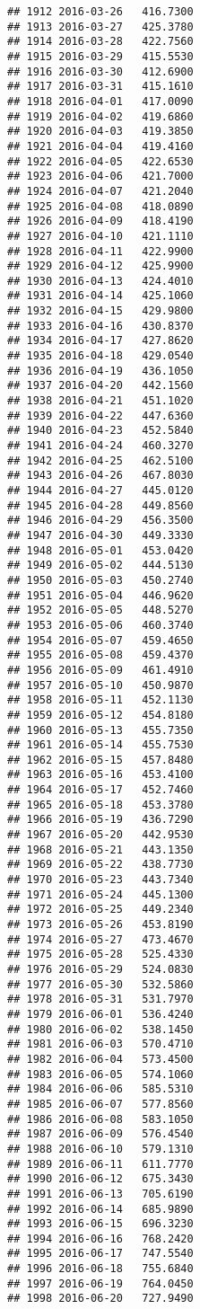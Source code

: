 \documentclass[
]{article}
\begin{document}
\begin{verbatim}
## 1912 2016-03-26   416.7300
## 1913 2016-03-27   425.3780
## 1914 2016-03-28   422.7560
## 1915 2016-03-29   415.5530
## 1916 2016-03-30   412.6900
## 1917 2016-03-31   415.1610
## 1918 2016-04-01   417.0090
## 1919 2016-04-02   419.6860
## 1920 2016-04-03   419.3850
## 1921 2016-04-04   419.4160
## 1922 2016-04-05   422.6530
## 1923 2016-04-06   421.7000
## 1924 2016-04-07   421.2040
## 1925 2016-04-08   418.0890
## 1926 2016-04-09   418.4190
## 1927 2016-04-10   421.1110
## 1928 2016-04-11   422.9900
## 1929 2016-04-12   425.9900
## 1930 2016-04-13   424.4010
## 1931 2016-04-14   425.1060
## 1932 2016-04-15   429.9800
## 1933 2016-04-16   430.8370
## 1934 2016-04-17   427.8620
## 1935 2016-04-18   429.0540
## 1936 2016-04-19   436.1050
## 1937 2016-04-20   442.1560
## 1938 2016-04-21   451.1020
## 1939 2016-04-22   447.6360
## 1940 2016-04-23   452.5840
## 1941 2016-04-24   460.3270
## 1942 2016-04-25   462.5100
## 1943 2016-04-26   467.8030
## 1944 2016-04-27   445.0120
## 1945 2016-04-28   449.8560
## 1946 2016-04-29   456.3500
## 1947 2016-04-30   449.3330
## 1948 2016-05-01   453.0420
## 1949 2016-05-02   444.5130
## 1950 2016-05-03   450.2740
## 1951 2016-05-04   446.9620
## 1952 2016-05-05   448.5270
## 1953 2016-05-06   460.3740
## 1954 2016-05-07   459.4650
## 1955 2016-05-08   459.4370
## 1956 2016-05-09   461.4910
## 1957 2016-05-10   450.9870
## 1958 2016-05-11   452.1130
## 1959 2016-05-12   454.8180
## 1960 2016-05-13   455.7350
## 1961 2016-05-14   455.7530
## 1962 2016-05-15   457.8480
## 1963 2016-05-16   453.4100
## 1964 2016-05-17   452.7460
## 1965 2016-05-18   453.3780
## 1966 2016-05-19   436.7290
## 1967 2016-05-20   442.9530
## 1968 2016-05-21   443.1350
## 1969 2016-05-22   438.7730
## 1970 2016-05-23   443.7340
## 1971 2016-05-24   445.1300
## 1972 2016-05-25   449.2340
## 1973 2016-05-26   453.8190
## 1974 2016-05-27   473.4670
## 1975 2016-05-28   525.4330
## 1976 2016-05-29   524.0830
## 1977 2016-05-30   532.5860
## 1978 2016-05-31   531.7970
## 1979 2016-06-01   536.4240
## 1980 2016-06-02   538.1450
## 1981 2016-06-03   570.4710
## 1982 2016-06-04   573.4500
## 1983 2016-06-05   574.1060
## 1984 2016-06-06   585.5310
## 1985 2016-06-07   577.8560
## 1986 2016-06-08   583.1050
## 1987 2016-06-09   576.4540
## 1988 2016-06-10   579.1310
## 1989 2016-06-11   611.7770
## 1990 2016-06-12   675.3430
## 1991 2016-06-13   705.6190
## 1992 2016-06-14   685.9890
## 1993 2016-06-15   696.3230
## 1994 2016-06-16   768.2420
## 1995 2016-06-17   747.5540
## 1996 2016-06-18   755.6840
## 1997 2016-06-19   764.0450
## 1998 2016-06-20   727.9490

\end{verbatim}
\end{document}

